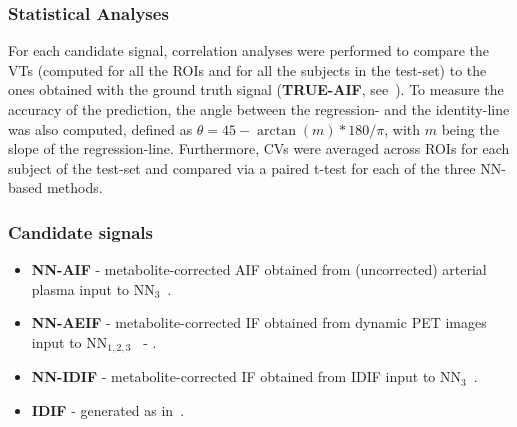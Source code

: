         \subsubsection{Statistical Analyses} \label{sec:stats}
        For each candidate signal, correlation analyses were performed to compare the \glspl{VT} (computed for all the \glspl{ROI} and for all the subjects in the test-set) to the ones obtained with the ground truth signal (\textbf{TRUE-AIF}, see~). To measure the accuracy of the prediction, the angle between the regression- and the identity-line was also computed, defined as $\theta = 45 - \arctan(m)*180/\pi$, with $m$ being the slope of the regression-line.
        Furthermore, \glspl{CV} were averaged across \glspl{ROI} for each subject of the test-set and compared via a paired t-test for each of the three \gls{NN}-based methods.
       
        \subsubsection{Candidate signals} \label{sec:candidates}
            \begin{itemize}
                \item \textbf{\gls{NN}-\gls{AIF}} - metabolite-corrected \gls{AIF} obtained from (uncorrected) arterial plasma input to \gls{NN}$_3$~.
                \item \textbf{\gls{NN}-\gls{AE}\gls{IF}} - metabolite-corrected \gls{IF} obtained from dynamic \gls{PET} images input to \gls{NN}$_{1,2,3}$~ - .
                \item \textbf{\gls{NN}-\gls{IDIF}} - metabolite-corrected \gls{IF} obtained from \gls{IDIF} input to \gls{NN}$_3$~.
                \item  \textbf{\gls{IDIF}} - generated as in~.
            \end{itemize}
